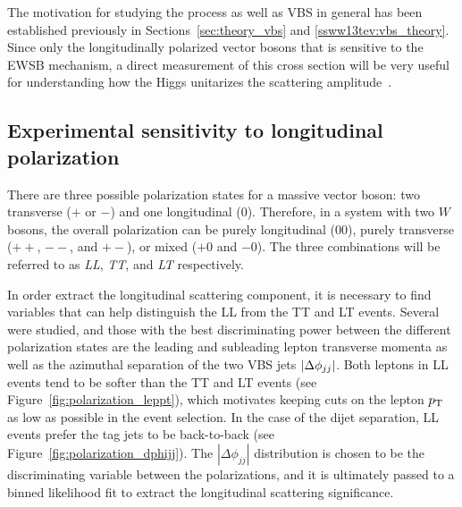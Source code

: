 The motivation for studying the \ssww process as well as VBS in general has been established previously in Sections~\ref{sec:theory_vbs} and \ref{ssww13tev:vbs_theory}.
Since only the longitudinally polarized vector bosons that is sensitive to the EWSB mechanism, a direct measurement of this cross section will be very useful for understanding how the Higgs unitarizes the scattering amplitude~\cite{2013.longitudinal-theory}.

\subsection{Experimental sensitivity to longitudinal polarization}\label{sec:sswwupgrade_longitudinal_sens}

There are three possible polarization states for a massive vector boson: two transverse ($+$ or $-$) and one longitudinal ($0$).
Therefore, in a system with two $W$ bosons, the overall polarization can be purely longitudinal ($00$), purely transverse ($++$, $--$, and $+-$), or mixed ($+0$ and $-0$).
The three combinations will be referred to as \emph{LL}, \emph{TT}, and \emph{LT} respectively.

In order extract the longitudinal scattering component, it is necessary to find variables that can help distinguish the LL from the TT and LT events.
Several were studied, and those with the best discriminating power between the different polarization states are the leading and subleading lepton transverse momenta as well as the azimuthal separation of the two VBS jets $|\Delta\phi_{jj}|$.
Both leptons in LL events tend to be softer than the TT and LT events (see Figure~\ref{fig:polarization_leppt}), which motivates keeping cuts on the lepton $p_{\mathrm{T}}$ as low as possible in the event selection. %
In the case of the dijet separation, LL events prefer the tag jets to be back-to-back (see Figure~\ref{fig:polarization_dphijj}).
The $|\Delta\phi_{jj}|$ distribution is chosen to be the discriminating variable between the polarizations, and it is ultimately passed to a binned likelihood fit to extract the longitudinal scattering significance.

